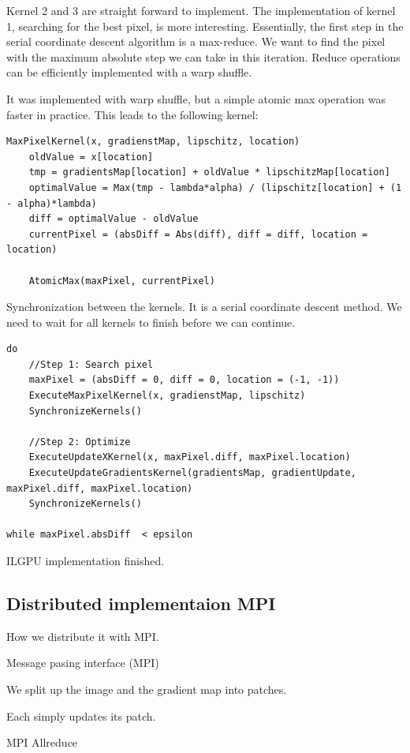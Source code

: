 Kernel 2 and 3 are straight forward to implement. The implementation of kernel 1, searching for the best pixel, is more interesting. Essentially, the first step in the serial coordinate descent algorithm is a max-reduce. We want to find the pixel with the maximum absolute step we can take in this iteration. Reduce operations can be efficiently implemented with a warp shuffle\cite{keplerShuffle}.

It was implemented with warp shuffle, but a simple atomic max operation was faster in practice. This leads to the following kernel:
\begin{lstlisting}
MaxPixelKernel(x, gradienstMap, lipschitz, location)
	oldValue = x[location]
	tmp = gradientsMap[location] + oldValue * lipschitzMap[location]
	optimalValue = Max(tmp - lambda*alpha) / (lipschitz[location] + (1 - alpha)*lambda)
	diff = optimalValue - oldValue
	currentPixel = (absDiff = Abs(diff), diff = diff, location = location)
	
	AtomicMax(maxPixel, currentPixel)
\end{lstlisting}

Synchronization between the kernels. It is a serial coordinate descent method. We need to wait for all kernels to finish before we can continue.


\begin{lstlisting}
do 
	//Step 1: Search pixel
	maxPixel = (absDiff = 0, diff = 0, location = (-1, -1))
	ExecuteMaxPixelKernel(x, gradienstMap, lipschitz)
	SynchronizeKernels()
	
	//Step 2: Optimize
	ExecuteUpdateXKernel(x, maxPixel.diff, maxPixel.location)
	ExecuteUpdateGradientsKernel(gradientsMap, gradientUpdate, maxPixel.diff, maxPixel.location)
	SynchronizeKernels()
	
while maxPixel.absDiff  < epsilon
\end{lstlisting}

ILGPU implementation finished. 


\subsection{Distributed implementaion MPI}
How we distribute it with MPI.

Message pasing interface (MPI)


We split up the image and the gradient map into patches.

Each simply updates its patch.

MPI Allreduce


